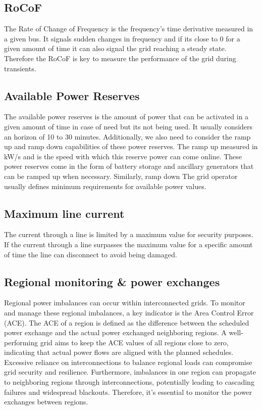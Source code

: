 \documentclass{article}
\begin{document}
\subsection*{RoCoF}

The Rate of Change of Frequency is the frequency's time derivative measured in a given bus. It signals sudden changes in frequency and if its close to $0$ for a given amount of time it can also signal the grid reaching a steady state. Therefore the RoCoF is key to measure the performance of the grid during transients. 

\subsection*{Available Power Reserves}

The available power reserves is the amount of power that can be activated in a given amount of time in case of need but its not being used. It usually considers an horizon of 10 to 30 minutes. Additionally, we also need to consider the ramp up and ramp down capabilities of these power reserves. The ramp up measured in kW/s and is the speed with which this reserve power can come online. These power reserves come in the form of battery storage and ancillary generators that can be ramped up when necessary. Similarly, ramp down The grid operator usually defines minimum requirements for available power values.


\subsection*{Maximum line current}

The current through a line is limited by a maximum value for security purposes. If the current through a line surpasses the maximum value for a specific amount of time the line can disconnect to avoid being damaged.

\subsection*{Regional monitoring \& power exchanges}

Regional power imbalances can occur within interconnected grids.
To monitor and manage these regional imbalances, a key indicator is the Area Control Error (ACE). The ACE of a region is defined as the difference between the scheduled power exchange and the actual power exchanged neighboring regions. A well-performing grid aims to keep the ACE values of all regions close to zero, indicating that actual power flows are aligned with the planned schedules. Excessive reliance on interconnections to balance regional loads can compromise grid security and resilience. Furthermore, imbalances in one region can propagate to neighboring regions through interconnections, potentially leading to cascading failures and widespread blackouts. Therefore, it's essential to monitor the power exchanges between regions.
\end{document}
